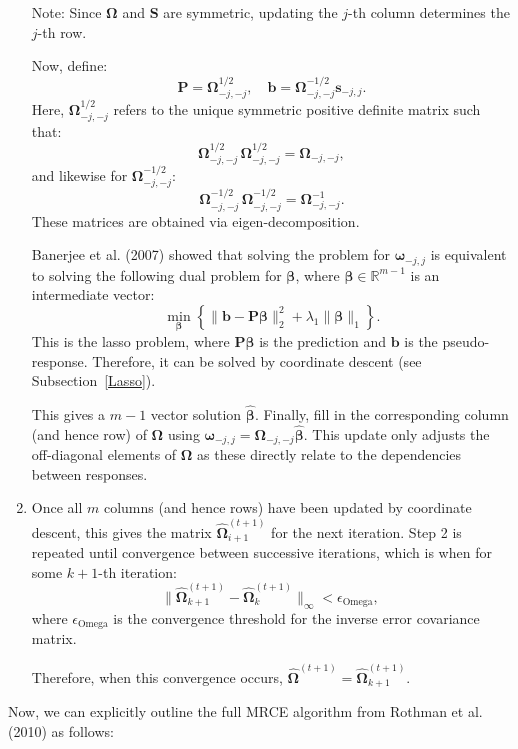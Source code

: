 \documentclass[11pt]{report} %
\begin{document}
\begin{enumerate}
  \noindent Note: Since \( \boldsymbol{\Omega} \) and \( \mathbf{S} \) are symmetric, updating the \( j \)-th column determines the \( j \)-th row.

  
   Now, define:
  \[
  \mathbf{P} = \mathbf{\Omega}^{1/2}_{-j,-j}, \quad \mathbf{b} = \mathbf{\Omega}_{-j,-j}^{-1/2}\mathbf{s}_{-j,j}.
  \]
  Here, $\boldsymbol{\Omega}_{-j,-j}^{1/2}$ refers to the unique symmetric positive definite matrix such that:
\[
\boldsymbol{\Omega}_{-j,-j}^{1/2} \, \boldsymbol{\Omega}_{-j,-j}^{1/2} = \boldsymbol{\Omega}_{-j,-j},
\]
and likewise for $\boldsymbol{\Omega}_{-j,-j}^{-1/2}$:
\[
\boldsymbol{\Omega}_{-j,-j}^{-1/2} \, \boldsymbol{\Omega}_{-j,-j}^{-1/2} = \boldsymbol{\Omega}^{-1}_{-j,-j}.
\]
These matrices are obtained via eigen-decomposition.

Banerjee et al. (2007) showed that solving the problem for $\boldsymbol{\omega}_{-j,j}$ is equivalent to solving
the following dual problem for \( \boldsymbol{\beta} \), where $\boldsymbol{\beta} \in \mathbb{R}^{m-1}$ is an intermediate vector:
  \[
\min_{\boldsymbol{\beta}} \left\{ \| \mathbf{b} - \mathbf{P} \boldsymbol{\beta} \|_2^2 + \lambda_1 \| \boldsymbol{\beta} \|_1 \right\}.
\]
This is the lasso problem, where \( \mathbf{P}\boldsymbol{\beta} \) is the prediction and \( \mathbf{b} \) is the pseudo-response. Therefore, it can be solved by coordinate descent (see Subsection~\ref {Lasso}).

\vspace{0.1cm}
This gives a \( m - 1 \) vector solution \( \hat{\boldsymbol{\beta}} \). 
    Finally, fill in the corresponding column (and hence row) of \( \mathbf{\Omega} \) using 
    \( \boldsymbol{\omega}_{-j,j} = \mathbf{\Omega}_{-j,-j}\hat{\boldsymbol{\beta}}\). This update only adjusts the off-diagonal elements of $\mathbf{\Omega}$ as these directly relate to the dependencies between responses.
    
\item Once all \( m \) columns (and hence rows) have been updated by coordinate descent, this gives the matrix \( \hat{\boldsymbol{\Omega}}^{(t+1)}_{i+1} \) for the next iteration. Step 2 is repeated until convergence between successive iterations, which is when for some $k+1$-th iteration:
\[
\|\boldsymbol{\hat{\Omega}}^{(t+1)}_{k+1} - \boldsymbol{\hat{\Omega}}^{(t+1)}_{k}\|_{\infty} < \epsilon_\text{Omega},\
\]
where $\epsilon_\text{Omega}$ is the convergence threshold for the inverse error covariance matrix.\cite{friedman2008sparse, banerjee2008model}

Therefore, when this convergence occurs, $\mathbf{\hat{\Omega}}^{(t+1)}=\boldsymbol{\hat{\Omega}}^{(t+1)}_{k+1}$.
\end{enumerate}
\noindent Now, we can explicitly outline the full MRCE algorithm from Rothman et al. (2010) as follows:
\end{document}
